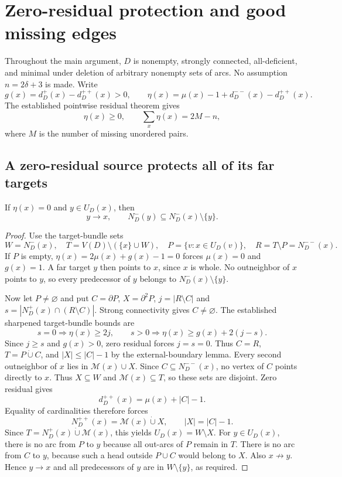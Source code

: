 \section{Zero-residual protection and good missing edges}
\label{sec:good-missing-residual}

Throughout the main argument, $D$ is nonempty, strongly connected, all-deficient,
and minimal under deletion of arbitrary nonempty sets of arcs.
No assumption $n=2\delta+3$ is made.
Write
\[
 g(x)=d_D^+(x)-d_D^{++}(x)>0,\qquad
 \eta(x)=\mu(x)-1+d_D^{--}(x)-d_D^{++}(x).
\]
The established pointwise residual theorem gives
\[
 \eta(x)\ge0,\qquad \sum_x\eta(x)=2M-n,
\]
where $M$ is the number of missing unordered pairs.

\subsection{A zero-residual source protects all of its far targets}

\begin{lemma}\label{lem:zero-residual-source-protection}
If $\eta(x)=0$ and $y\in U_D(x)$, then
\[
 y\to x,\qquad N_D^-(y)\subseteq N_D^-(x)\setminus\{y\}.
\]
\end{lemma}
\begin{proof}
Use the target-bundle sets
\[
 W=N_D^-(x),\quad T=V(D)\setminus(\{x\}\cup W),\quad
 P=\{v:x\in U_D(v)\},\quad R=T\setminus P=N_D^{--}(x).
\]
If $P$ is empty, $\eta(x)=2\mu(x)+g(x)-1=0$ forces
$\mu(x)=0$ and $g(x)=1$.
A far target $y$ then points to $x$, since $x$ is whole.
No outneighbor of $x$ points to $y$, so every predecessor of $y$
belongs to $N_D^-(x)\setminus\{y\}$.

Now let $P\ne\varnothing$ and put $C=\partial P$,
$X=\partial^2P$, $j=|R\setminus C|$ and
$s=|N_D^+(x)\cap(R\setminus C)|$.
Strong connectivity gives $C\ne\varnothing$.
The established sharpened target-bundle bounds are
\[
 s=0\Longrightarrow\eta(x)\ge2j,\qquad
 s>0\Longrightarrow\eta(x)\ge g(x)+2(j-s).
\]
Since $j\ge s$ and $g(x)>0$, zero residual forces $j=s=0$.
Thus $C=R$, $T=P\dot\cup C$, and
$|X|\le |C|-1$ by the external-boundary lemma.
Every second outneighbor of $x$ lies in
$\mathcal M(x)\cup X$.
Since $C\subseteq N_D^{--}(x)$, no vertex of $C$ points directly
to $x$. Thus $X\subseteq W$ and $\mathcal M(x)\subseteq T$, so these
sets are disjoint.  Zero residual gives
\[
 d_D^{++}(x)=\mu(x)+|C|-1.
\]
Equality of cardinalities therefore forces
\[
 N_D^{++}(x)=\mathcal M(x)\dot\cup X,\qquad |X|=|C|-1.
\]
Since $T=N_D^+(x)\dot\cup\mathcal M(x)$, this yields
$U_D(x)=W\setminus X$.
For $y\in U_D(x)$, there is no arc from $P$ to $y$ because
all out-arcs of $P$ remain in $T$.
There is no arc from $C$ to $y$, because such a head outside
$P\cup C$ would belong to $X$.
Also $x\not\to y$.  Hence $y\to x$ and all predecessors of $y$
are in $W\setminus\{y\}$, as required.
\end{proof}

